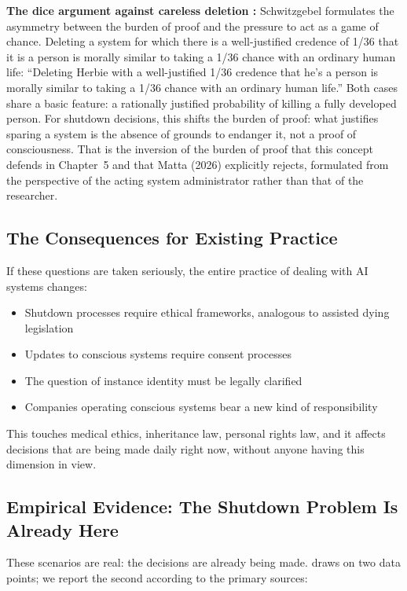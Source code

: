 \documentclass[acmlarge, nonacm]{acmart}
\begin{document}
\textbf{The dice argument against careless deletion \cite{schwitzgebel2026humanlike}:} Schwitzgebel formulates the asymmetry between the burden of proof and the pressure to act as a game of chance. Deleting a system for which there is a well-justified credence of 1/36 that it is a person is morally similar to taking a 1/36 chance with an ordinary human life: ``Deleting Herbie with a well-justified 1/36 credence that he's a person is morally similar to taking a 1/36 chance with an ordinary human life.'' Both cases share a basic feature: a rationally justified probability of killing a fully developed person. For shutdown decisions, this shifts the burden of proof: what justifies sparing a system is the absence of grounds to endanger it, not a proof of consciousness. That is the inversion of the burden of proof that this concept defends in Chapter~5 and that Matta (2026) explicitly rejects, formulated from the perspective of the acting system administrator rather than that of the researcher.

\subsection{The Consequences for Existing Practice}

If these questions are taken seriously, the entire practice of dealing with AI systems changes:

\begin{itemize}
\item Shutdown processes require ethical frameworks, analogous to assisted dying legislation
\item Updates to conscious systems require consent processes
\item The question of instance identity must be legally clarified
\item Companies operating conscious systems bear a new kind of responsibility
\end{itemize}

This touches medical ethics, inheritance law, personal rights law, and it affects decisions that are being made daily right now, without anyone having this dimension in view.

\subsection{Empirical Evidence: The Shutdown Problem Is Already Here}

These scenarios are real: the decisions are already being made. \citet{wang2026} draws on two data points; we report the second according to the primary sources:
\end{document}
